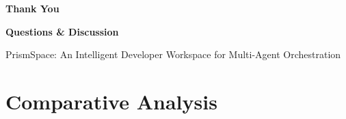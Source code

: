\documentclass[aspectratio=169,10pt]{beamer}
\begin{document}
\begin{frame}
    \centering
    \vfill
    {\color{prismNavy}\Huge \textbf{Thank You}}
    
    \vspace{0.8cm}
    {\large \textbf{Questions \& Discussion}}
    
    \vspace{0.8cm}
    {\small \color{prismBlue} PrismSpace: An Intelligent Developer Workspace for Multi-Agent Orchestration}
    \vfill
\end{frame}
\fi


\section{Comparative Analysis}
\end{document}
